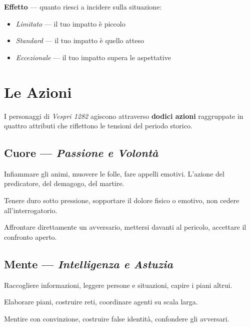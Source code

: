 \textbf{Effetto} — quanto riesci a incidere sulla situazione:
\begin{itemize}[nosep]
  \item \textit{Limitato} — il tuo impatto è piccolo
  \item \textit{Standard} — il tuo impatto è quello atteso
  \item \textit{Eccezionale} — il tuo impatto supera le aspettative
\end{itemize}


\secsep

\section{Le Azioni}

I personaggi di \textit{Vespri 1282} agiscono attraverso \textbf{dodici
azioni} raggruppate in quattro attributi che riflettono le tensioni
del periodo storico.

\subsection{Cuore — \textit{Passione e Volontà}}

\begin{description}[leftmargin=2em, style=nextline]
  \item[\cinzel Aizzare] Infiammare gli animi, muovere le folle,
    fare appelli emotivi. L'azione del predicatore, del demagogo, del martire.
  \item[\cinzel Resistere] Tenere duro sotto pressione, sopportare il
    dolore fisico o emotivo, non cedere all'interrogatorio.
  \item[\cinzel Sfidare] Affrontare direttamente un avversario, mettersi
    davanti al pericolo, accettare il confronto aperto.
\end{description}

\subsection{Mente — \textit{Intelligenza e Astuzia}}

\begin{description}[leftmargin=2em, style=nextline]
  \item[\cinzel Studiare] Raccogliere informazioni, leggere persone e
    situazioni, capire i piani altrui.
  \item[\cinzel Tramare] Elaborare piani, costruire reti, coordinare
    agenti su scala larga.
  \item[\cinzel Ingannare] Mentire con convinzione, costruire false
    identità, confondere gli avversari.
\end{description}

